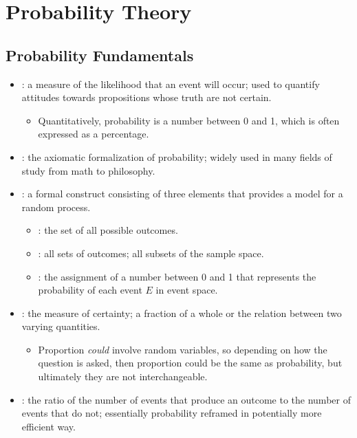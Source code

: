 \chapter{Probability Theory}

\section{Probability Fundamentals}
\begin{itemize}
  \item {}: a measure of the likelihood that an event will occur; used to quantify attitudes towards propositions whose truth are not certain.
    \begin{itemize}
      \item Quantitatively, probability is a number between 0 and 1, which is often expressed as a percentage.
    \end{itemize}
  \item {}: the axiomatic formalization of probability; widely used in many fields of study from math to philosophy.
  \item {}: a formal construct consisting of three elements that provides a model for a random process.
    \begin{itemize}
      \item {}: the set of all possible outcomes.
      \item {}: all sets of outcomes; all subsets of the sample space.
      \item {}: the assignment of a number between 0 and 1 that represents the probability of each event \(E\) in event space.
    \end{itemize}
  \item {}: the measure of certainty; a fraction of a whole or the relation between two varying quantities.
    \begin{itemize}
      \item Proportion \textit{could} involve random variables, so depending on how the question is asked, then proportion could be the same as probability, but ultimately they are not interchangeable.
    \end{itemize}
  \item {}: the ratio of the number of events that produce an outcome to the number of events that do not; essentially probability reframed in potentially more efficient way.


\end{itemize}
